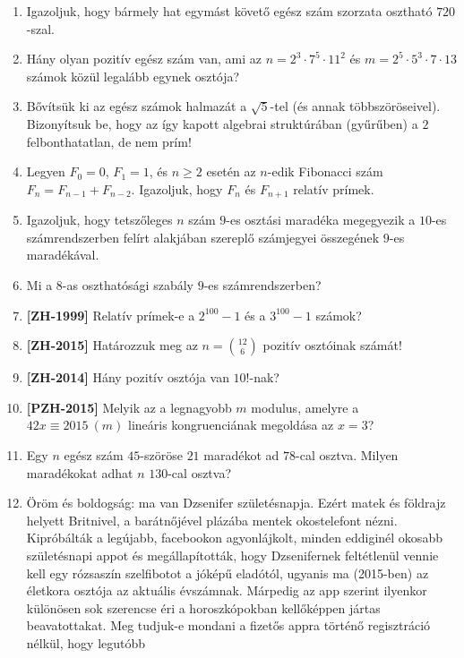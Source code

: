 \documentclass[a4paper, 12pt]{article}
\begin{document}
\begin{enumerate}
            \item Igazoljuk, hogy bármely hat egymást követő egész szám szorzata osztható $720$-szal.
            \item Hány olyan pozitív egész szám van, ami az $n = 2^3 \cdot 7^5 \cdot 11^2$ és $m=2^5\cdot 5^3 \cdot 7 \cdot 13$ számok közül legalább egynek osztója?
            \item Bővítsük ki az egész számok halmazát a $\sqrt{5}$-tel (és annak többszöröseivel). Bizonyítsuk be, hogy az így kapott algebrai struktúrában (gyűrűben) a $2$ felbonthatatlan, de nem prím!
            \item Legyen $F_0 = 0$, $F_1 = 1$, és $n \geq 2$ esetén az $n$-edik Fibonacci szám $F_n = F_{n-1} + F_{n-2}$. Igazoljuk, hogy $F_n$ és $F_{n+1}$ relatív prímek.
            \item Igazoljuk, hogy tetszőleges $n$ szám $9$-es osztási maradéka megegyezik a $10$-es számrendszerben felírt alakjában szereplő számjegyei összegének $9$-es maradékával.
            \item Mi a $8$-as oszthatósági szabály $9$-es számrendszerben?
            \item \textbf{[ZH-1999]} Relatív prímek-e a $2^{100}-1$ és a $3^{100}-1$ számok?
            \item \textbf{[ZH-2015]} Határozzuk meg az $n=\binom{12}{6}$ pozitív osztóinak számát!
            \item \textbf{[ZH-2014]} Hány pozitív osztója van $10!$-nak?
            \item \textbf{[PZH-2015]} Melyik az a legnagyobb $m$ modulus, amelyre a $42x\equiv 2015 \ (m)$ lineáris kongruenciának megoldása az $x=3$?
            \item Egy $n$ egész szám $45$-szöröse $21$ maradékot ad $78$-cal osztva. Milyen maradékokat adhat $n$ $130$-cal osztva?
            \item Öröm és boldogság: ma van Dzsenifer születésnapja. Ezért matek és földrajz
            helyett Britnivel, a barátnőjével plázába mentek okostelefont
            nézni. Kipróbálták a legújabb, facebookon agyonlájkolt, minden eddiginél
            okosabb születésnapi appot és megállapították, hogy Dzsenifernek
            feltétlenül vennie kell egy rózsaszín szelfibotot a jóképű eladótól,
            ugyanis ma (2015-ben) az életkora osztója
            az aktuális évszámnak. Márpedig az app szerint ilyenkor különösen sok
            szerencse éri a horoszkópokban kellőképpen jártas beavatottakat. Meg
            tudjuk-e mondani a fizetős appra történő regisztráció nélkül, hogy legutóbb

\end{enumerate}
\end{document}
